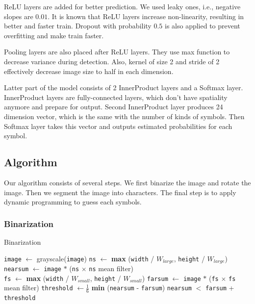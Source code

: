 \documentclass[10pt,twocolumn,letterpaper]{article}
\begin{document}
ReLU layers are added for better prediction.
We used leaky ones, i.e., negative slopes are $0.01$.
It is known that ReLU layers increase non-linearity, resulting in better and faster train.
Dropout with probability $0.5$ is also applied to prevent overfitting and make train faster.

Pooling layers are also placed after ReLU layers.
They use max function to decrease variance during detection.
Also, kernel of size 2 and stride of 2 effectively decrease image size to half in each dimension.

Latter part of the model consists of 2 InnerProduct layers and a Softmax layer.
InnerProduct layers are fully-connected layers, which don't have spatiality anymore and prepare for output.
Second InnerProduct layer produces 24 dimension vector, which is the same with the number of kinds of symbols.
Then Softmax layer takes this vector and outputs estimated probabilities for each symbol.

\subsection{Algorithm}

Our algorithm consists of several steps. We first binarize the image and rotate the image.
Then we segment the image into characters.
The final step is to apply dynamic programming to guess each symbols.

\subsubsection{Binarization}

\begin{algorithm}
\caption{Binarization} \label{binarization}
\begin{algorithmic}[1]
\State \texttt{image} $\gets$ grayscale(\texttt{image})
\State \texttt{ns} $\gets$ \textbf{max} (\texttt{width} / $W_{large}$, \texttt{height} / $W_{large}$)
\State \texttt{nearsum} $\gets$ \texttt{image} $\ast$ (\texttt{ns} $\times$ \texttt{ns} mean filter) \\
\State \texttt{fs} $\gets$ \textbf{max} (\texttt{width} / $W_{small}$, \texttt{height} / $W_{small}$)
\State \texttt{farsum} $\gets$ \texttt{image} $\ast$ (\texttt{fs} $\times$ \texttt{fs} mean filter)
\State \texttt{threshold} $\gets \frac{1}{6}$ \textbf{min} (\texttt{nearsum} - \texttt{farsum})
\State \Return \texttt{nearsum} $<$ \texttt{farsum} + \texttt{threshold}
\EndFunction
\end{algorithmic}
\end{algorithm}
\end{document}
